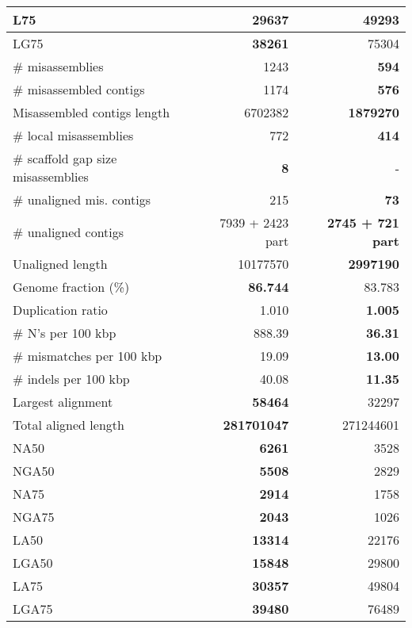\documentclass[12pt,a4paper]{article}
\begin{document}
\begin{table}[ht]
\begin{center}
\begin{tabular}{|l*{2}{|r}|}
L75 & {\bf 29637} & 49293 \\ \hline
LG75 & {\bf 38261} & 75304 \\ \hline
\# misassemblies & 1243 & {\bf 594} \\ \hline
\# misassembled contigs & 1174 & {\bf 576} \\ \hline
Misassembled contigs length & 6702382 & {\bf 1879270} \\ \hline
\# local misassemblies & 772 & {\bf 414} \\ \hline
\# scaffold gap size misassemblies & {\bf 8} & - \\ \hline
\# unaligned mis. contigs & 215 & {\bf 73} \\ \hline
\# unaligned contigs & 7939 + 2423 part & {\bf 2745 + 721 part} \\ \hline
Unaligned length & 10177570 & {\bf 2997190} \\ \hline
Genome fraction (\%) & {\bf 86.744} & 83.783 \\ \hline
Duplication ratio & 1.010 & {\bf 1.005} \\ \hline
\# N's per 100 kbp & 888.39 & {\bf 36.31} \\ \hline
\# mismatches per 100 kbp & 19.09 & {\bf 13.00} \\ \hline
\# indels per 100 kbp & 40.08 & {\bf 11.35} \\ \hline
Largest alignment & {\bf 58464} & 32297 \\ \hline
Total aligned length & {\bf 281701047} & 271244601 \\ \hline
NA50 & {\bf 6261} & 3528 \\ \hline
NGA50 & {\bf 5508} & 2829 \\ \hline
NA75 & {\bf 2914} & 1758 \\ \hline
NGA75 & {\bf 2043} & 1026 \\ \hline
LA50 & {\bf 13314} & 22176 \\ \hline
LGA50 & {\bf 15848} & 29800 \\ \hline
LA75 & {\bf 30357} & 49804 \\ \hline
LGA75 & {\bf 39480} & 76489 \\ \hline
\end{tabular}
\end{center}
\end{table}
\end{document}
